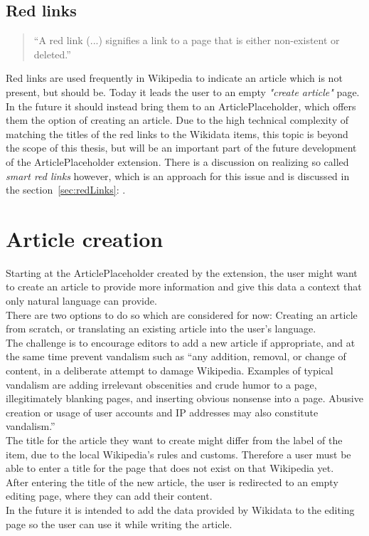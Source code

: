 \subsection{Red links}
\begin{quotation}
``A red link (...) signifies a link to a page that is either non-existent or deleted.'' \citep{wiki:01} 
\end{quotation}

Red links are used frequently in Wikipedia to indicate an article which is not present, but should be. Today it leads the user to an empty \textit{"create article"} page. In the future it should instead bring them to an ArticlePlaceholder, which offers them the option of creating an article. Due to the high technical complexity of matching the titles of the red links to the Wikidata items, this topic is beyond the scope of this thesis, but will be an important part of the future development of the ArticlePlaceholder extension. There is a discussion on realizing so called \textit{smart red links} however, which is an approach for this issue and is discussed in the section~\ref{sec:redLinks}: .

\section{Article creation}
Starting at the ArticlePlaceholder created by the extension, the user might want to create an article to provide more information and give this data a context that only natural language can provide. \\
There are two options to do so which are considered for now: Creating an article from scratch, or translating an existing article into the user's language. \\
The challenge is to encourage editors to add a new article if appropriate, and at the same time prevent vandalism such as ``any addition, removal, or change of content, in a deliberate attempt to damage Wikipedia. Examples of typical vandalism are adding irrelevant obscenities and crude humor to a page, illegitimately blanking pages, and inserting obvious nonsense into a page. Abusive creation or usage of user accounts and IP addresses may also constitute vandalism.'' \citep{wiki:33} \\ 
The title for the article they want to create might differ from the label of the item, due to the local Wikipedia's rules and customs. Therefore a user must be able to enter a title for the page that does not exist on that Wikipedia yet. \\
After entering the title of the new article, the user is redirected to an empty editing page, where they can add their content. \\
In the future it is intended to add the data provided by Wikidata to the editing page so the user can use it while writing the article. 

